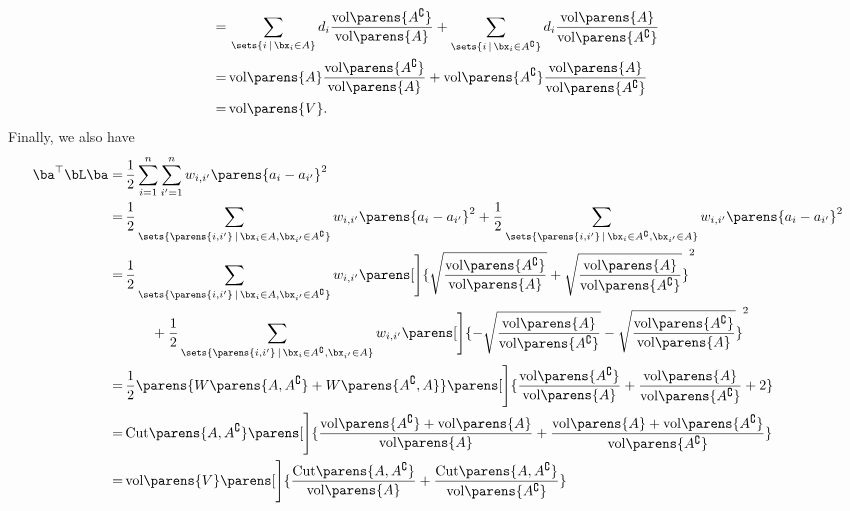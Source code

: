 \documentclass[12pt]{article}
\begin{document}
\begin{enumerate}[label=\textbf{\arabic*.}]
\begin{enumerate}
\begin{align*}
			= & \, \sum_{\sets{i \,\vert\, \bx_i \in A}} d_i \frac{\mathrm{vol} \parens{A^{\complement}}}{\mathrm{vol} \parens{A}} + \sum_{\sets{i \,\vert\, \bx_i \in A^{\complement}}} d_i \frac{\mathrm{vol} \parens{A}}{ \mathrm{vol} \parens{A^{\complement}}} \\ 
			= & \, \mathrm{vol} \parens{A} \frac{\mathrm{vol} \parens{A^{\complement}}}{\mathrm{vol} \parens{A}} + \mathrm{vol} \parens{A^{\complement}} \frac{\mathrm{vol} \parens{A}}{ \mathrm{vol} \parens{A^{\complement}}} \\ 
			= & \, \mathrm{vol} \parens{V}. 
		\end{align*}
		Finally, we also have 
		\begin{align*}
			\ba^\top \bL \ba = & \, \frac{1}{2} \sum_{i=1}^n \sum_{i'=1}^n w_{i, i'} \parens{a_i - a_{i'}}^2 \\ 
			= & \, \frac{1}{2} \sum_{\sets{ \parens{i, i'} \,\vert\, \bx_i \in A, \bx_{i'} \in A^{\complement}}} w_{i, i'} \parens{a_i - a_{i'}}^2 + \frac{1}{2} \sum_{\sets{ \parens{i, i'} \,\vert\, \bx_i \in A^{\complement}, \bx_{i'} \in A}} w_{i, i'} \parens{a_i - a_{i'}}^2 \\ 
			= & \, \frac{1}{2} \sum_{\sets{ \parens{i, i'} \,\vert\, \bx_i \in A, \bx_{i'} \in A^{\complement}}} w_{i, i'} \parens[\Bigg]{\sqrt{\frac{\mathrm{vol} \parens{A^{\complement}}}{\mathrm{vol} \parens{A}}} + \sqrt{\frac{\mathrm{vol} \parens{A}}{ \mathrm{vol} \parens{A^{\complement}}}}}^2 \\ 
			& \qquad + \frac{1}{2} \sum_{\sets{ \parens{i, i'} \,\vert\, \bx_i \in A^{\complement}, \bx_{i'} \in A}} w_{i, i'} \parens[\Bigg]{- \sqrt{\frac{\mathrm{vol} \parens{A}}{ \mathrm{vol} \parens{A^{\complement}}}} - \sqrt{\frac{\mathrm{vol} \parens{A^{\complement}}}{\mathrm{vol} \parens{A}}} }^2 \\ 
			= & \, \frac{1}{2} \parens{W \parens{A, A^{\complement}} + W \parens{A^{\complement}, A}} \parens[\Bigg]{\frac{\mathrm{vol} \parens{A^{\complement}}}{\mathrm{vol} \parens{A}} + \frac{\mathrm{vol} \parens{A}}{ \mathrm{vol} \parens{A^{\complement}}} + 2} \\ 
			= & \, \mathrm{Cut} \parens{A, A^{\complement}} \parens[\Bigg]{\frac{\mathrm{vol} \parens{A^{\complement}} + \mathrm{vol} \parens{A}}{\mathrm{vol} \parens{A}} + \frac{\mathrm{vol} \parens{A} + \mathrm{vol} \parens{A^{\complement}}}{ \mathrm{vol} \parens{A^{\complement}}} } \\ 
			= & \, \mathrm{vol} \parens{V} \parens[\Bigg]{\frac{\mathrm{Cut} \parens{A, A^{\complement}} }{\mathrm{vol} \parens{A}} + \frac{\mathrm{Cut} \parens{A, A^{\complement}}}{ \mathrm{vol} \parens{A^{\complement}}} } \\ 

\end{align*}
\end{enumerate}
\end{enumerate}
\end{document}
